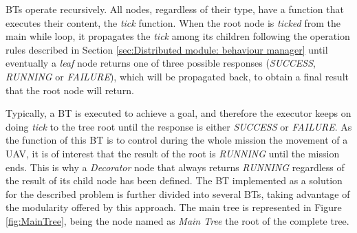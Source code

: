 \documentclass[fontsize=11pt, English=false, Español=true, Myfinal=true, twoside, numbers=noenddot]{scrbook}
\begin{document}
{\glspl{BT} operate recursively. All nodes, regardless of their type, have a function that executes their content, the \emph{tick} function. When the root node is \emph{ticked} from the main while loop, it propagates the \emph{tick} among its children following the operation rules described in Section \ref{sec:Distributed module: behaviour manager} until eventually a \emph{leaf} node returns one of three possible responses (\emph{SUCCESS}, \emph{RUNNING} or \emph{FAILURE}), which will be propagated back, to obtain a final result that the root node will return. 

Typically, a \gls{BT} is executed to achieve a goal, and therefore the executor keeps on doing \emph{tick} to the tree root until the response is either \emph{SUCCESS} or \emph{FAILURE}. As the function of this \gls{BT} is to control during the whole mission the movement of a \gls{UAV}, it is of interest that the result of the root is \emph{RUNNING} until the mission ends. This is why a \emph{Decorator} node that always returns \emph{RUNNING} regardless of the result of its child node has been defined. The \gls{BT} implemented as a solution for the described problem is further divided into several \glspl{BT}, taking advantage of the modularity offered by this approach. The main tree is represented in Figure \ref{fig:MainTree}, being the node named as \emph{Main Tree} the root of the complete tree.

\begin{figure}[ht]
	\begin{center}
\end{center}
\end{figure}}
\end{document}
